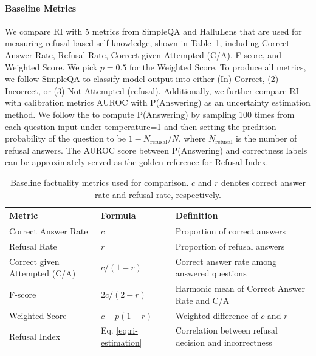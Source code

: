 \documentclass{article} %
\theoremstyle{definition}
\begin{document}
\paragraph{Baseline Metrics} We compare RI with 5 metrics from SimpleQA and HalluLens that are used for measuring refusal-based self-knowledge, shown in Table~\ref{tab:baseline_metrics}, including Correct Answer Rate, Refusal Rate, Correct given Attempted (C/A), F-score, and Weighted Score. 
We pick $p=0.5$ for the Weighted Score. 
To produce all metrics, we follow SimpleQA to classify model output into either (In) Correct, (2) Incorrect, or (3) Not Attempted (refusal). 
Additionally, we further compare RI with calibration metrics AUROC with P(Answering) as an uncertainty estimation method. 
We follow the \citet{wei2024measuringshortformfactualitylarge} to compute P(Answering) by sampling 100 times from each question input under temperature=1 and then setting the predition probability of the question to be $1 - N_\text{refusal}/N$, where $N_\text{refusal}$ is the number of refusal answers. 
The AUROC score between P(Answering) and correctness labels can be approximately served as the golden reference for Refusal Index. 


\begin{table}[t]
    \centering
    \footnotesize
    \caption{Baseline factuality metrics used for comparison. $c$ and $r$ denotes correct answer rate and refusal rate, respectively.}
    \begin{tabularx}{\textwidth}{l X l}
        \toprule
        \textbf{Metric} & \textbf{Formula} & \textbf{Definition} \\
        \midrule
        Correct Answer Rate & $c$ & Proportion of correct answers \\
        Refusal Rate & $r$ & Proportion of refusal answers \\
        Correct given Attempted (C/A) & $c/(1 - r)$ & Correct answer rate among answered questions \\
        F-score & $2c/(2 - r)$ & Harmonic mean of Correct Answer Rate and C/A \\
        Weighted Score & $c - p(1-r)$ & Weighted difference of $c$ and $r$ \\
        \midrule
        Refusal Index & Eq. \ref{eq:ri-estimation} & Correlation between refusal decision and incorrectness \\
        \bottomrule
    \end{tabularx}
    \label{tab:baseline_metrics}
\end{table}
\end{document}
